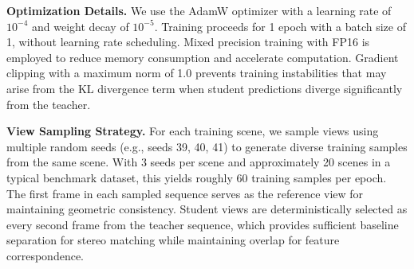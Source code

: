\textbf{Optimization Details.} We use the AdamW optimizer with a learning rate of $10^{-4}$ and weight decay of $10^{-5}$. Training proceeds for 1 epoch with a batch size of 1, without learning rate scheduling. Mixed precision training with FP16 is employed to reduce memory consumption and accelerate computation. Gradient clipping with a maximum norm of 1.0 prevents training instabilities that may arise from the KL divergence term when student predictions diverge significantly from the teacher.

\textbf{View Sampling Strategy.} For each training scene, we sample views using multiple random seeds (e.g., seeds 39, 40, 41) to generate diverse training samples from the same scene. With 3 seeds per scene and approximately 20 scenes in a typical benchmark dataset, this yields roughly 60 training samples per epoch. The first frame in each sampled sequence serves as the reference view for maintaining geometric consistency. Student views are deterministically selected as every second frame from the teacher sequence, which provides sufficient baseline separation for stereo matching while maintaining overlap for feature correspondence.
